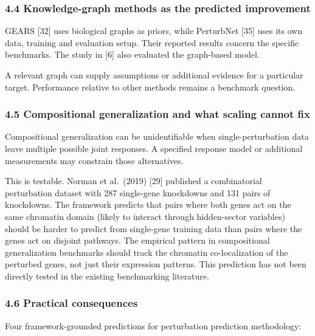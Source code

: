 \documentclass[
]{article}
\begin{document}
\hypertarget{knowledge-graph-methods-as-the-predicted-improvement}{%
\subsubsection{4.4 Knowledge-graph methods as the predicted
improvement}\label{knowledge-graph-methods-as-the-predicted-improvement}}

GEARS {[}32{]} uses biological graphs as priors, while PerturbNet
{[}35{]} uses its own data, training and evaluation setup. Their
reported results concern the specific benchmarks. The study in {[}6{]}
also evaluated the graph-based model.

A relevant graph can supply assumptions or additional evidence for a
particular target. Performance relative to other methods remains a
benchmark question.

\hypertarget{compositional-generalization-and-what-scaling-cannot-fix}{%
\subsubsection{4.5 Compositional generalization and what scaling cannot
fix}\label{compositional-generalization-and-what-scaling-cannot-fix}}

Compositional generalization can be unidentifiable when
single-perturbation data leave multiple possible joint responses. A
specified response model or additional measurements may constrain those
alternatives.

This is testable. Norman et al.~(2019) {[}29{]} published a
combinatorial perturbation dataset with 287 single-gene knockdowns and
131 pairs of knockdowns. The framework predicts that pairs where both
genes act on the same chromatin domain (likely to interact through
hidden-sector variables) should be harder to predict from single-gene
training data than pairs where the genes act on disjoint pathways. The
empirical pattern in compositional generalization benchmarks should
track the chromatin co-localization of the perturbed genes, not just
their expression patterns. This prediction has not been directly tested
in the existing benchmarking literature.

\hypertarget{practical-consequences-2}{%
\subsubsection{4.6 Practical
consequences}\label{practical-consequences-2}}

Four framework-grounded predictions for perturbation prediction
methodology:
\end{document}

